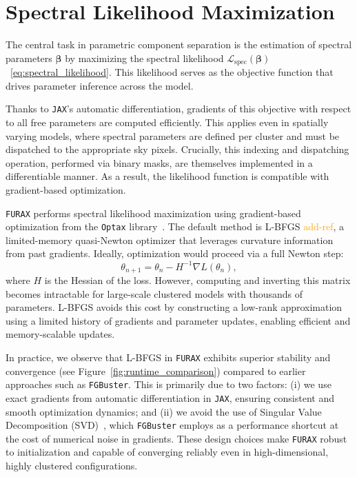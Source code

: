 \documentclass[fleqn,usenatbib]{mnras}
\newcommand{\je}[1]{\textcolor{orange}{#1}}
\begin{document}
\section{Spectral Likelihood Maximization}

The central task in parametric component separation is the estimation of spectral parameters \( \boldsymbol{\beta} \) by maximizing the spectral likelihood \( \mathcal{L}_{\mathrm{spec}}(\boldsymbol{\beta}) \)~\eqref{eq:spectral_likelihood}. This likelihood serves as the objective function that drives parameter inference across the model.

Thanks to \texttt{JAX}'s automatic differentiation, gradients of this objective with respect to all free parameters are computed efficiently. This applies even in spatially varying models, where spectral parameters are defined per cluster and must be dispatched to the appropriate sky pixels. Crucially, this indexing and dispatching operation, performed via binary masks, are themselves implemented in a differentiable manner. As a result, the likelihood function is compatible with gradient-based optimization.

\texttt{FURAX} performs spectral likelihood maximization using gradient-based optimization from the \texttt{Optax} library~\citep{optax}. The default method is L-BFGS \je{add-ref}, a limited-memory quasi-Newton optimizer that leverages curvature information from past gradients. Ideally, optimization would proceed via a full Newton step:
\begin{equation}
    \theta_{n+1} = \theta_n - H^{-1} \nabla L(\theta_n),
\end{equation}
where \( H \) is the Hessian of the loss. However, computing and inverting this matrix becomes intractable for large-scale clustered models with thousands of parameters. L-BFGS avoids this cost by constructing a low-rank approximation using a limited history of gradients and parameter updates, enabling efficient and memory-scalable updates.

In practice, we observe that L-BFGS in \texttt{FURAX} exhibits superior stability and convergence (see Figure~\ref{fig:runtime_comparison}) compared to earlier approaches such as \texttt{FGBuster}. This is primarily due to two factors: (i) we use exact gradients from automatic differentiation in \texttt{JAX}, ensuring consistent and smooth optimization dynamics; and (ii) we avoid the use of Singular Value Decomposition (SVD)~\citep{SVD}, which \texttt{FGBuster} employs as a performance shortcut at the cost of numerical noise in gradients. These design choices make \texttt{FURAX} robust to initialization and capable of converging reliably even in high-dimensional, highly clustered configurations.
\end{document}
